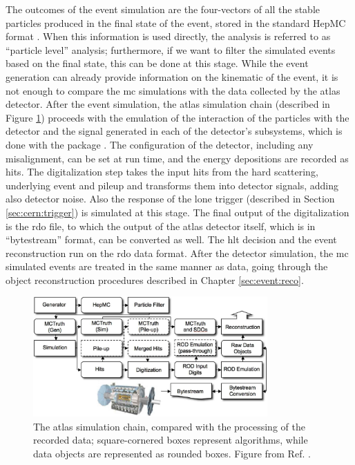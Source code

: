 The outcomes of the event simulation are the four-vectors of all the stable particles produced in the final state of the event, stored in the standard HepMC format \cite{Dobbs:2001ck}.
When this information is used directly, the analysis is referred to as ``particle level'' analysis; furthermore, if we want to filter the simulated events based on the final state, this can be done at this stage. 
While the event generation can already provide information on the kinematic of the event, it is not enough to compare the \gls{mc} simulations with the 
data collected by the \gls{atlas} detector. 
After the event simulation, the \gls{atlas} simulation chain \cite{Aad:2010ah} (described in Figure \ref{fig:sim:chain}) proceeds with the emulation of the
interaction of the particles with the detector and the signal generated in each of the detector's subsystems, 
which is done with the \geant package \cite{Agostinelli:2002hh}. The configuration of the detector, including any misalignment, can be set at run time, and the energy depositions are recorded as hits. The digitalization step takes the input hits from the hard scattering, underlying event and pileup and transforms them into detector signals, adding also detector noise. Also the response of the \gls{lone} trigger (described in Section \ref{sec:cern:trigger}) is simulated at this stage. The final output of the digitalization is the \gls{rdo} file, to which the output of the \gls{atlas} detector itself, which is in ``bytestream'' format, can be converted as well. The \gls{hlt} decision and the event reconstruction run on the \gls{rdo} data format. After the detector simulation, the \gls{mc} simulated events are treated in the same manner as data, going through the object reconstruction procedures
described in Chapter \ref{sec:event:reco}.

\begin{figure}[h]
\begin{center}
    \includegraphics[width=0.8\textwidth]{figures/Chap4/Rizzi-Fig4-5.pdf}
\end{center}
\caption{The \gls{atlas} simulation chain, compared with the processing of the recorded data; square-cornered boxes represent algorithms, while data objects are represented as rounded boxes. Figure from Ref. \cite{Aad:2010ah}.}
 \label{fig:sim:chain}
\end{figure}

